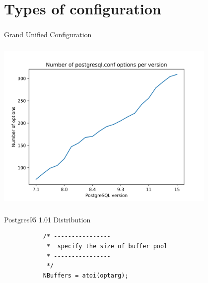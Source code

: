 \documentclass[usenames,dvipsnames, 18pt, compress, aspectratio=169]{beamer}
\begin{document}
\section{Types of configuration}

\begin{frame}[fragile]{}
    \frametitle{}
    \begin{center}

        Grand Unified Configuration

    \end{center}
\end{frame}

\begin{frame}[fragile]{}
    \frametitle{}
    \begin{center}

        \includegraphics[width=0.8\textwidth,center]{options.png}

    \end{center}
\end{frame}

\begin{frame}[fragile]{}
    \frametitle{}
    \begin{center}

		Postgres95 1.01 Distribution

		\vspace{0.5cm}
        \begin{verbatim}
           /* ----------------
            *  specify the size of buffer pool
            * ----------------
            */
           NBuffers = atoi(optarg);
        \end{verbatim}

    \end{center}
\end{frame}
\end{document}

